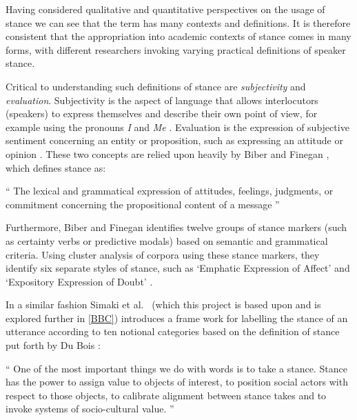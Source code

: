 \documentclass[Dissertation.tex]{subfiles}
\begin{document}

Having considered qualitative and quantitative perspectives on the usage of stance we can see that the term has many contexts and definitions.  It is therefore consistent that the appropriation into academic contexts of stance comes in many forms, with different researchers invoking varying practical definitions of speaker stance.

Critical to understanding such definitions of stance are \textit{subjectivity} and \textit{evaluation}. Subjectivity is the aspect of language that allows interlocutors (speakers)  to express themselves and describe their own point of view, for example using the pronouns \textit{I} and \textit{Me} \cite{matthewsSubjectivity2014}. Evaluation is the expression of subjective sentiment concerning an entity or proposition, such as expressing an attitude or opinion \cite{hunstonEvaluationTextAuthorial2000}. These two concepts are relied upon heavily by Biber and Finegan \cite{biberStylesStanceEnglish1989}, which defines stance as:

\begin{displayquote} `` The lexical and grammatical expression of attitudes, feelings, judgments, or commitment concerning the propositional content of a message ''
\end{displayquote}


Furthermore, Biber and Finegan \cite{biberStylesStanceEnglish1989} identifies twelve groups of stance markers (such as certainty verbs or predictive modals) based on semantic and grammatical criteria. Using cluster analysis of corpora using these stance markers, they identify six separate styles of stance, such as ‘Emphatic Expression of Affect’ and ‘Expository Expression of Doubt’ \cite{biberStylesStanceEnglish1989}. 

In a similar fashion Simaki et al.\ \cite{simakiAnnotatingSpeakerStance2017} (which this project is based upon and is explored further in \ref{BBC}) introduces a frame work for labelling the stance of an utterance according to ten notional categories based on the definition of stance put forth by Du Bois \cite{duboisStanceTriangle2007}:

\begin{displayquote}
	`` One of the most important things we do with words is to take a stance. Stance has the power to assign value to objects of interest, to position social actors with respect to those objects, to calibrate alignment between stance takes and to invoke systems of socio-cultural value. ''
\end{displayquote}
\end{document}
